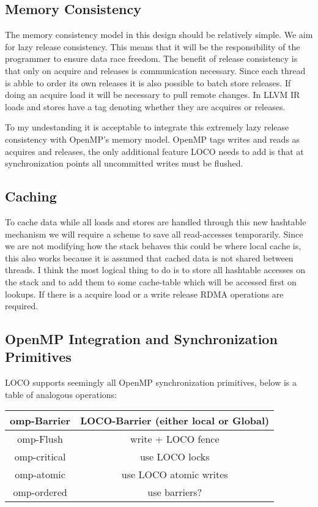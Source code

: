 \documentclass[sigplan,nonacm]{acmart}
\begin{document}
\subsection{Memory Consistency}
The memory consistency model in this design should be relatively simple. We aim for 
lazy release consistency. This means that it will be the responsibility of the programmer 
to ensure data race freedom. The benefit of release consistency is that only on acquire
and releases is communication necessary. Since each thread is abble to order its own releases
it is also possible to batch store releases. If doing an acquire load it will be necessary to pull remote 
changes. 
In LLVM IR loads and stores have a tag denoting whether they are acquires or releases.

To my undestanding it is acceptable to integrate this extremely lazy release consistency 
with OpenMP's memory model. OpenMP tags writes and reads as acquires and releases, the only 
additional feature LOCO needs to add is that at synchronization points all uncommitted writes
must be flushed.


\subsection{Caching}
To cache data while all loads and stores are handled through this new hashtable 
mechanism we will require a scheme to save all read-accesses temporarily. Since 
we are not modifying how the stack behaves this could be where local cache is, this 
also works because it is assumed that cached data is not shared between threads.
I think the most logical thing to do is to store all hashtable accesses on the stack 
and to add them to some cache-table which will be accessed first on lookups. If there 
is a acquire load or a write release RDMA operations are required.

\subsection{OpenMP Integration and Synchronization Primitives}
LOCO supports seemingly all OpenMP synchronization primitives, below is a table of 
analogous operations:

\begin{center}
    \begin{tabular}{ |c|c| } 
     \hline
     omp-Barrier & LOCO-Barrier (either local or Global) \\ 
     \hline
     omp-Flush & write + LOCO fence\\ 
     \hline
     omp-critical & use LOCO locks \\ 
     \hline
     omp-atomic & use LOCO atomic writes \\
     \hline
     omp-ordered & use barriers? \\
     \hline
    \end{tabular}
\end{center}
\end{document}
